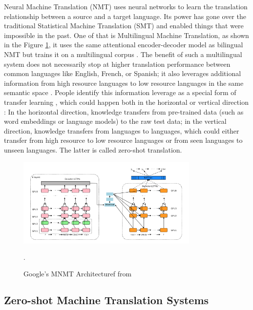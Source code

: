 \documentclass[thesis,fonts=libertine]{cluu}
\begin{document}
Neural Machine Translation (NMT) uses neural networks to learn the translation relationship between a source and a target language. Its power has gone over the traditional Statistical Machine Translation (SMT) and enabled things that were impossible in the past. One of that is Multilingual Machine Translation, as shown in the Figure \ref{fig:google_mnmt}, it uses the same attentional encoder-decoder model as bilingual NMT but trains it on a multilingual corpus \parencite{Johnson:2016aa}. The benefit of such a multilingual system does not necessarily stop at higher translation performance between common languages like English, French, or Spanish; it also leverages additional information from high resource languages to low resource languages in the same semantic space \parencite{Ha:2016aa}. People identify this information leverage as a special form of transfer learning \parencite{Zoph:2016aa}, which could happen both in the horizontal or vertical direction \parencite{Lakew:2019aa}: In the horizontal direction, knowledge transfers from pre-trained data (such as word embeddings or language models) to the raw test data; in the vertical direction, knowledge transfers from languages to languages, which could either transfer from high resource to low resource languages or from seen languages to unseen languages. The latter is called zero-shot translation.

\begin{figure}
  \label{fig:google_mnmt}
  \centering
  \includegraphics[width=0.8\textwidth]{google_mnmt_architecture.png}
  \caption{Google's MNMT Architecturef from \parencite{Johnson:2016aa}}. 
\end{figure}

\subsection{Zero-shot Machine Translation Systems}
\label{sec:zero_shot_mt}
\end{document}

